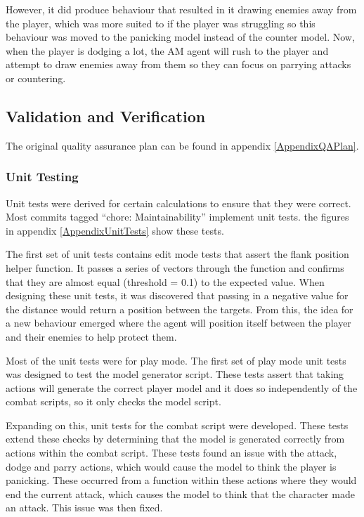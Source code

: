 \documentclass{IEEEtran}
\begin{document}
However, it did produce behaviour that resulted in it drawing enemies away from the player, which was more suited to if the player was struggling so this behaviour was moved to the panicking model instead of the counter model. Now, when the player is dodging a lot, the AM agent will rush to the player and attempt to draw enemies away from them so they can focus on parrying attacks or countering.

\subsection{Validation and Verification}
\label{Validation}

The original quality assurance plan can be found in appendix \ref{AppendixQAPlan}.

\subsubsection{Unit Testing}

Unit tests were derived for certain calculations to ensure that they were correct. Most commits tagged “chore: Maintainability” implement unit tests. the figures in appendix \ref{AppendixUnitTests} show these tests.

The first set of unit tests contains edit mode tests that assert the flank position helper function. It passes a series of vectors through the function and confirms that they are almost equal (threshold = 0.1) to the expected value. When designing these unit tests, it was discovered that passing in a negative value for the distance would return a position between the targets. From this, the idea for a new behaviour emerged where the agent will position itself between the player and their enemies to help protect them.

Most of the unit tests were for play mode. The first set of play mode unit tests was designed to test the model generator script. These tests assert that taking actions will generate the correct player model and it does so independently of the combat scripts, so it only checks the model script.

Expanding on this, unit tests for the combat script were developed. These tests extend these checks by determining that the model is generated correctly from actions within the combat script. These tests found an issue with the attack, dodge and parry actions, which would cause the model to think the player is panicking. These occurred from a function within these actions where they would end the current attack, which causes the model to think that the character made an attack. This issue was then fixed.
\end{document}

